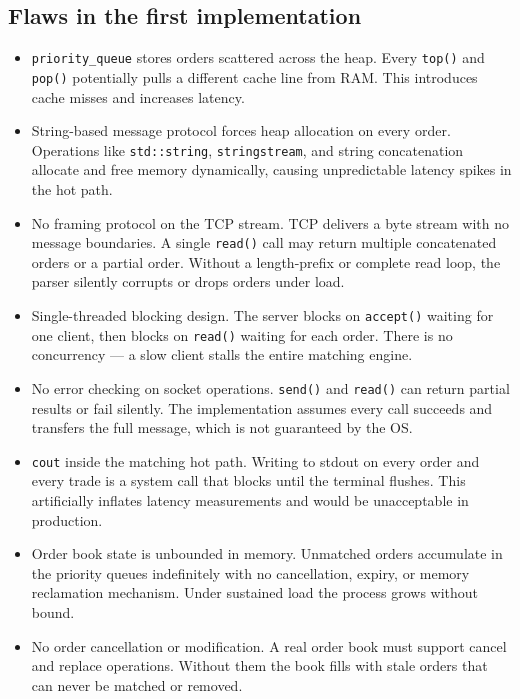 \documentclass{article}
\begin{document}
\subsection{Flaws in the first implementation}
\begin{itemize}

    \item \texttt{priority\_queue} stores orders scattered across the heap. Every \texttt{top()} and \texttt{pop()} potentially pulls a different cache line from RAM. This introduces cache misses and increases latency.

    \item String-based message protocol forces heap allocation on every order. Operations like \texttt{std::string}, \texttt{stringstream}, and string concatenation allocate and free memory dynamically, causing unpredictable latency spikes in the hot path.

    \item No framing protocol on the TCP stream. TCP delivers a byte stream with no message boundaries. A single \texttt{read()} call may return multiple concatenated orders or a partial order. Without a length-prefix or complete read loop, the parser silently corrupts or drops orders under load.

    \item Single-threaded blocking design. The server blocks on \texttt{accept()} waiting for one client, then blocks on \texttt{read()} waiting for each order. There is no concurrency — a slow client stalls the entire matching engine.

    \item No error checking on socket operations. \texttt{send()} and \texttt{read()} can return partial results or fail silently. The implementation assumes every call succeeds and transfers the full message, which is not guaranteed by the OS.

    \item \texttt{cout} inside the matching hot path. Writing to stdout on every order and every trade is a system call that blocks until the terminal flushes. This artificially inflates latency measurements and would be unacceptable in production.

    \item Order book state is unbounded in memory. Unmatched orders accumulate in the priority queues indefinitely with no cancellation, expiry, or memory reclamation mechanism. Under sustained load the process grows without bound.

    \item No order cancellation or modification. A real order book must support cancel and replace operations. Without them the book fills with stale orders that can never be matched or removed.

\end{itemize}
\end{document}
